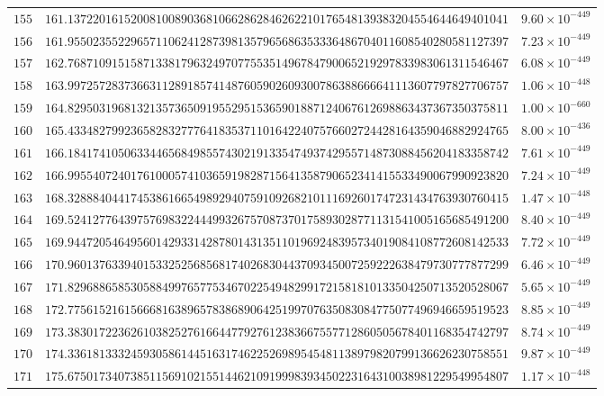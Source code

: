 \documentclass[12pt,reqno]{amsart}
\theoremstyle{remark}
\begin{document}
\begin{longtable}{clc}
$155$ & $161.1372201615200810089036810662862846262210176548139383204554644649401041$ & $9.60\times 10^{-449}$ \\
$156$ & $161.9550235522965711062412873981357965686353336486704011608540280581127397$ & $7.23\times 10^{-449}$ \\
$157$ & $162.7687109151587133817963249707755351496784790065219297833983061311546467$ & $6.08\times 10^{-449}$ \\
$158$ & $163.9972572837366311289185741487605902609300786388666641113607797827706757$ & $1.06\times 10^{-448}$ \\
$159$ & $164.8295031968132135736509195529515365901887124067612698863437367350375811$ & $1.00\times 10^{-660}$ \\
$160$ & $165.4334827992365828327776418353711016422407576602724428164359046882924765$ & $8.00\times 10^{-436}$ \\
$161$ & $166.1841741050633446568498557430219133547493742955714873088456204183358742$ & $7.61\times 10^{-449}$ \\
$162$ & $166.9955407240176100057410365919828715641358790652341415533490067990923820$ & $7.24\times 10^{-449}$ \\
$163$ & $168.3288840441745386166549892940759109268210111692601747231434763930760415$ & $1.47\times 10^{-448}$ \\
$164$ & $169.5241277643975769832244499326757087370175893028771131541005165685491200$ & $8.40\times 10^{-449}$ \\
$165$ & $169.9447205464956014293314287801431351101969248395734019084108772608142533$ & $7.72\times 10^{-449}$ \\
$166$ & $170.9601376339401533252568568174026830443709345007259222638479730777877299$ & $6.46\times 10^{-449}$ \\
$167$ & $171.8296886585305884997657753467022549482991721581810133504250713520528067$ & $5.65\times 10^{-449}$ \\
$168$ & $172.7756152161566681638965783868906425199707635083084775077496946659519523$ & $8.85\times 10^{-449}$ \\
$169$ & $173.3830172236261038252761664477927612383667557712860505678401168354742797$ & $8.74\times 10^{-449}$ \\
$170$ & $174.3361813332459305861445163174622526989545481138979820799136626230758551$ & $9.87\times 10^{-449}$ \\
$171$ & $175.6750173407385115691021551446210919998393450223164310038981229549954807$ & $1.17\times 10^{-448}$ \\

\end{longtable}
\end{document}
